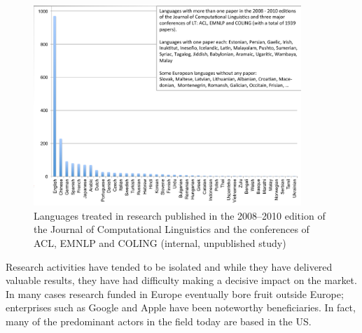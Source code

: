 \documentclass[10pt, plain]{../../metanetpaper}
\begin{document}
\begin{multicols}{2}
\begin{figure}[htb]
  \center
  \includegraphics[width=0.90\textwidth]{../_media/Languages-in-LT-Research}
  \caption{Languages treated in research published in the 2008--2010 edition of the Journal of Computational Linguistics and the conferences of ACL, EMNLP and COLING (internal, unpublished study)}
  \label{fig:languages-in-research}
\end{figure}

Research activities have tended to be isolated and while they have delivered valuable results, they have had difficulty making a decisive impact on the market. In many cases research funded in Europe eventually bore fruit outside Europe; enterprises such as Google and Apple have been noteworthy beneficiaries. In fact, many of the predominant actors in the field today are based in the US.

%
%
%
%


\end{multicols}
\end{document}
